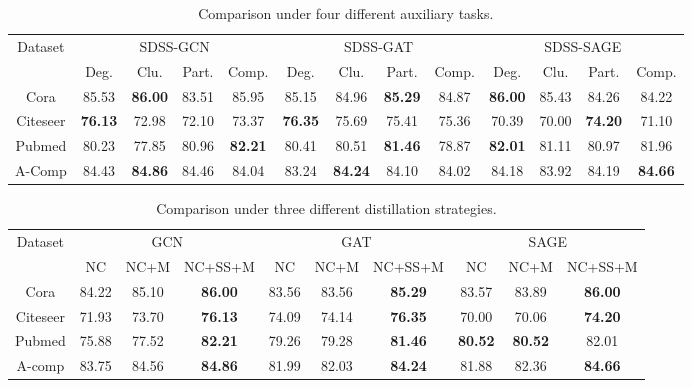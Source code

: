 \documentclass[letterpaper]{article} \usepackage{aaai22} \usepackage{times} \usepackage{helvet} \usepackage{courier} \usepackage[hyphens]{url} \usepackage{graphicx} \urlstyle{rm} \def\UrlFont{\rm} \usepackage{subfigure}
\begin{document}
	\begin{table*}[htbp]
		\centering
		\begin{tabular}{c|cccc|cccc|cccc}
			\hline
			\multirow{2}{*}{Dataset} & \multicolumn{4}{c|}{SDSS-GCN} & \multicolumn{4}{c|}{SDSS-GAT} & \multicolumn{4}{c}{SDSS-SAGE} \\ \cline{2-13} 
			& Deg. & Clu. & Part. & \multicolumn{1}{c|}{Comp.} & Deg. & Clu. & Part. & \multicolumn{1}{c|}{Comp.} & Deg. & Clu. & Part. & Comp. \\ \hline
			Cora & 85.53 & \textbf{86.00} & 83.51 & 85.95 & 85.15 & 84.96 & \textbf{85.29} & 84.87 & \textbf{86.00} & 85.43 & 84.26 & 84.22 \\
			Citeseer & \textbf{76.13} & 72.98 & 72.10 & 73.37 & \textbf{76.35} & 75.69 & 75.41 & 75.36 & 70.39 & 70.00 & \textbf{74.20} & 71.10 \\
			Pubmed & 80.23 & 77.85 & 80.96 & \textbf{82.21} & 80.41 & 80.51 & \textbf{81.46} & 78.87 & \textbf{82.01} & 81.11 & 80.97 & 81.96 \\
			A-Comp & 84.43 & \textbf{84.86} & 84.46 & 84.04 & 83.24 & \textbf{84.24} & 84.10 & 84.02 & 84.18 & 83.92 & 84.19 & \textbf{84.66} \\ \hline
		\end{tabular}
		\caption{Comparison under four different auxiliary tasks.}
		\label{tab:task1}
	\end{table*}
	
	\begin{table*}[htbp]
		\centering
		\begin{tabular}{c|ccc|ccc|ccc}
			\hline
			\multirow{2}{*}{Dataset} & \multicolumn{3}{c|}{GCN} & \multicolumn{3}{c|}{GAT} & \multicolumn{3}{c}{SAGE} \\ 
			\cline{2-10} 
			& NC & NC+M & NC+SS+M & NC & NC+M & NC+SS+M & NC & NC+M & NC+SS+M \\
			\hline
			Cora & 84.22 & 85.10 & \textbf{86.00} & 83.56 & 83.56 & \textbf{85.29} & 83.57& 83.89 & \textbf{86.00} \\
			Citeseer & 71.93 & 73.70 & \textbf{76.13} & 74.09 & 74.14 & \textbf{76.35} & 70.00 & 70.06 & \textbf{74.20} \\
			Pubmed & 75.88 & 77.52 & \textbf{82.21} & 79.26 & 79.28 & \textbf{81.46} & \textbf{80.52} & \textbf{80.52} & 82.01 \\
			A-comp & 83.75 & 84.56 & \textbf{84.86} & 81.99 & 82.03 & \textbf{84.24} & 81.88 & 82.36 & \textbf{84.66} \\ \hline
		\end{tabular}
		\caption{Comparison under three different distillation strategies.}
		\label{tab:DistillingStrategies}
	\end{table*}
	
\end{document}
